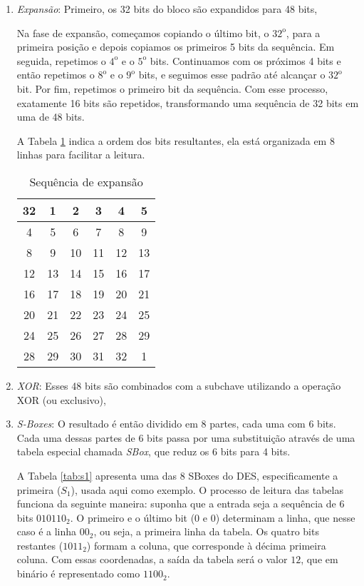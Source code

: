 \begin{enumerate}
\item {\em Expansão}: Primeiro, os 32 bits do bloco são expandidos para 48 bits,

  Na fase de expansão, começamos copiando o último bit, o $32^\text{o}$, para a primeira posição e depois copiamos os primeiros 5 bits da sequência.
  Em seguida, repetimos o $4^\text{o}$ e o $5^\text{o}$ bits.
  Continuamos com os próximos 4 bits e então repetimos o $8^\text{o}$ e o $9^\text{o}$ bits, e seguimos esse padrão até alcançar o $32^\text{o}$ bit.
  Por fim, repetimos o primeiro bit da sequência.
  Com esse processo, exatamente 16 bits são repetidos, transformando uma sequência de 32 bits em uma de 48 bits.

  A Tabela \ref{tab:expansao} indica a ordem dos bits resultantes, ela está organizada em 8 linhas para facilitar a leitura.
  
  \begin{table}[h!]
\centering
\begin{tabular}{|*{6}{c|}}
\hline
32 & 1  & 2  & 3  & 4  & 5  \\
\hline
4  & 5  & 6  & 7  & 8  & 9  \\
\hline
8  & 9  & 10 & 11 & 12 & 13 \\
\hline
12 & 13 & 14 & 15 & 16 & 17 \\
\hline
16 & 17 & 18 & 19 & 20 & 21 \\
\hline
20 & 21 & 22 & 23 & 24 & 25 \\
\hline
24 & 25 & 26 & 27 & 28 & 29 \\
\hline
28 & 29 & 30 & 31 & 32 & 1  \\
\hline
\end{tabular}
\label{tab:expansao}
\caption{Sequência de expansão}
\end{table}

    \item {\em XOR}: Esses 48 bits são combinados com a subchave utilizando a operação XOR (ou exclusivo),
    \item {\em S-Boxes}: O resultado é então dividido em 8 partes, cada uma com 6 bits.
      Cada uma dessas partes de 6 bits passa por uma substituição através de uma tabela especial chamada \textit{SBox}, que reduz os 6 bits para 4 bits.

      A Tabela \ref{tab:s1} apresenta uma das 8 SBoxes do DES, especificamente a primeira ($S_1$), usada aqui como exemplo.
      O processo de leitura das tabelas funciona da seguinte maneira:
      suponha que a entrada seja a sequência de 6 bits $010110_2$.
      O primeiro e o último bit ($0$ e $0$) determinam a linha, que nesse caso é a linha $00_2$, ou seja, a primeira linha da tabela.
      Os quatro bits restantes ($1011_2$) formam a coluna, que corresponde à décima primeira coluna.
      Com essas coordenadas, a saída da tabela será o valor $12$, que em binário é representado como $1100_2$.
      

\end{enumerate}
